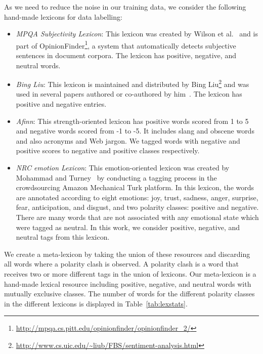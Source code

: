 \documentclass{sig-alternate}
\begin{document}
As we need to reduce the noise in our training data, we consider the following hand-made lexicons for data labelling:
\begin{itemize}
\item \emph{MPQA Subjectivity Lexicon}:  This lexicon was created by Wilson et al.~\cite{Wilson2005} and is part of OpinionFinder\footnote{\url{http://mpqa.cs.pitt.edu/opinionfinder/opinionfinder_2/}}, a system that automatically detects subjective sentences in document corpora. The lexicon has positive, negative, and neutral words. 
\item \emph{Bing Liu}: This lexicon is maintained and distributed by Bing
Liu\footnote{\url{http://www.cs.uic.edu/~liub/FBS/sentiment-analysis.html}} and
was used in several papers authored or co-authored by him~\cite{LiuBook}. The lexicon has positive and negative entries. 
\item \emph{Afinn}:  This strength-oriented lexicon \cite{Finn2011} has positive words scored from 1 to 5 and negative words scored from -1 to -5. It includes slang and obscene words and also acronyms and Web jargon. We tagged words with negative and positive scores to   negative and positive classes respectively.
\item \emph{NRC emotion Lexicon}: This emotion-oriented lexicon was created by Mohammad and Turney~\cite{Saaif2012}  by conducting a tagging process in the crowdsourcing Amazon Mechanical Turk platform. In this lexicon, the words are annotated according to eight emotions: joy, trust, sadness, anger, surprise, fear, anticipation, and disgust, and two polarity classes: positive and negative. There are many words that are not associated with any emotional state which were tagged as neutral. In this work, we consider positive, negative, and neutral tags from this lexicon. 
\end{itemize}

We create a meta-lexicon by taking the union of these resources and discarding all words where a polarity clash is observed. A polarity clash is a word that receives two or more different tags in the union of lexicons. Our meta-lexicon is a hand-made lexical resource including positive, negative, and neutral words with mutually exclusive classes. The number of words for the different polarity classes in the different lexicons is displayed in Table~\ref{tab:lexstats}.   
\end{document}
